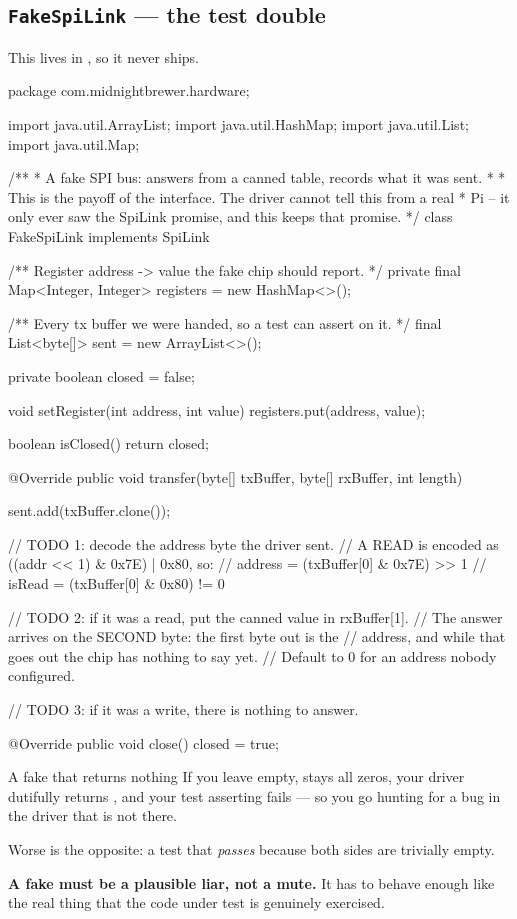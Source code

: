\subsection{\texttt{FakeSpiLink} --- the test double}

This lives in , so it never ships.

\begin{jcode}
package com.midnightbrewer.hardware;

import java.util.ArrayList;
import java.util.HashMap;
import java.util.List;
import java.util.Map;

/**
 * A fake SPI bus: answers from a canned table, records what it was sent.
 *
 * This is the payoff of the interface. The driver cannot tell this from a real
 * Pi -- it only ever saw the SpiLink promise, and this keeps that promise.
 */
class FakeSpiLink implements SpiLink {

    /** Register address -> value the fake chip should report. */
    private final Map<Integer, Integer> registers = new HashMap<>();

    /** Every tx buffer we were handed, so a test can assert on it. */
    final List<byte[]> sent = new ArrayList<>();

    private boolean closed = false;

    void setRegister(int address, int value) { registers.put(address, value); }

    boolean isClosed() { return closed; }

    @Override
    public void transfer(byte[] txBuffer, byte[] rxBuffer, int length) {
        sent.add(txBuffer.clone());

        // TODO 1: decode the address byte the driver sent.
        //   A READ is encoded as ((addr << 1) & 0x7E) | 0x80, so:
        //     address = (txBuffer[0] & 0x7E) >> 1
        //     isRead  = (txBuffer[0] & 0x80) != 0

        // TODO 2: if it was a read, put the canned value in rxBuffer[1].
        //   The answer arrives on the SECOND byte: the first byte out is the
        //   address, and while that goes out the chip has nothing to say yet.
        //   Default to 0 for an address nobody configured.

        // TODO 3: if it was a write, there is nothing to answer.
    }

    @Override
    public void close() { closed = true; }
}
\end{jcode}

\begin{trap}{A fake that returns nothing}
If you leave  empty,  stays all zeros, your
driver dutifully returns , and your test asserting  fails --- so you go hunting for a bug in the driver that is not there.

Worse is the opposite: a test that \emph{passes} because both sides are
trivially empty.

\textbf{A fake must be a plausible liar, not a mute.} It has to behave enough
like the real thing that the code under test is genuinely exercised.
\end{trap}

